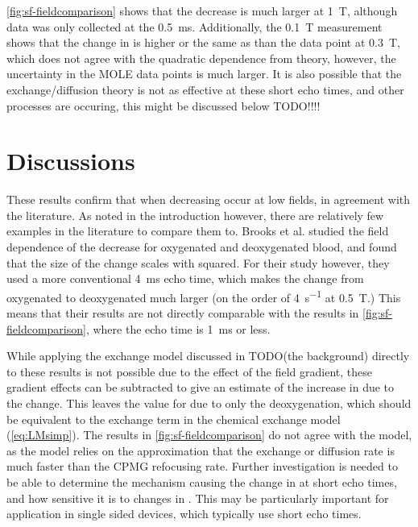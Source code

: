 \autoref{fig:sf-fieldcomparison} shows that the \Ttwo decrease is much larger at \SI{1}{T}, although data was only collected at the \SI{0.5}{ms}.
Additionally, the \SI{0.1}{\tesla} measurement shows that the change in \Rtwo is higher or the same as than the data point at \SI{0.3}{T}, which does not agree with the quadratic dependence from theory, however, the uncertainty in the MOLE data points is much larger.
It is also possible that the exchange/diffusion theory is not as effective at these short echo times, and other processes are occuring, this might be discussed below TODO!!!!

\section{Discussions}

These results confirm that \Ttwo when decreasing \SOtwo occur at low fields, in agreement with the literature.
As noted in the introduction however, there are relatively few examples in the literature to compare them to.
Brooks et al. studied the field dependence of the \Ttwo decrease for oxygenated and deoxygenated blood, and found that the size of the \Rtwo change scales with \Bzero  squared\cite[Fig.1]{BrooksComparisont2relaxation1995}.
For their study however, they used a more conventional \SI{4}{ms} echo time, which makes the \Rtwo change from oxygenated to deoxygenated much larger (on the order of \SI{4}{s^{-1}} at \SI{0.5}{T}.)
This means that their results are not directly comparable with the results in \autoref{fig:sf-fieldcomparison}, where the echo time is \SI{1}{ms} or less.

While applying the exchange model discussed in TODO(the background) directly to these results is not possible due to the effect of the field gradient, these gradient effects can be subtracted to give an estimate of the increase in \Rtwo due to the \SOtwo change.
This leaves the value for \Rtwo due to only the deoxygenation, which should be equivalent to the exchange term in the chemical exchange model (\autoref{eq:LMsimp}).
The results in \autoref{fig:sf-fieldcomparison} do not agree with the model, as the model relies on the approximation that the exchange or diffusion rate is much faster than the CPMG refocusing rate.
Further investigation is needed to be able to determine the mechanism causing the change in \Ttwo at short echo times, and how sensitive it is to changes in \SOtwo.
This may be particularly important for application in single sided devices, which typically use short echo times.

